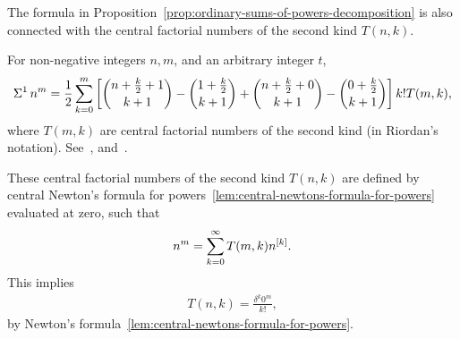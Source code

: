 The formula in Proposition~\eqref{prop:ordinary-sums-of-powers-decomposition} is also
connected with the central factorial numbers of the second kind $T(n,k)$.
\begin{proposition}
  \label{prop:central-factorial-numbers-sums}
  For non-negative integers $n,m$, and an arbitrary integer $t$,
  \begin{align*}
    \Sigma^{1}\,{n}^{m} = \frac{1}{2} \sum_{k=0}^{m}
    \left[
      \binom{n + \frac{k}{2} +1}{k+1} - \binom{1 + \tfrac{k}{2}}{k+1}
      + \binom{n + \frac{k}{2} + 0}{k+1} - \binom{0+\tfrac{k}{2}}{k+1}
    \right] k! T(m,k),
  \end{align*}
  where $T(m,k)$ are central factorial numbers
  of the second kind
  (in Riordan's notation). See~\cite[p. 213]{riordan1968combinatorial},
  and~\cite{carlitz1963divided}.
\end{proposition}
These central factorial numbers of the second kind $T(n,k)$ are
defined by central Newton's formula for
powers~\eqref{lem:central-newtons-formula-for-powers}
evaluated at zero, such that
\begin{align*}
  n^m = \sum_{k=0}^{\infty} T(m,k) n^{[k]}.
\end{align*}
This implies
\begin{align*}
  T(n,k) = \frac{\delta^{k} 0^m}{k!},
\end{align*}
by Newton's
formula~\eqref{lem:central-newtons-formula-for-powers}.
